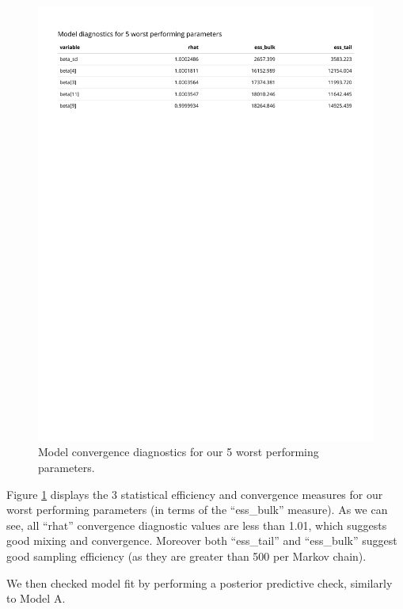 \documentclass[
]{article}
\begin{document}
\begin{figure}

{\centering \includegraphics[width=1\linewidth]{../outputs/bayesian-analysis-landfall-freq/model-no-year-effect/no-year-model-diagnostics} 

}

\caption{Model convergence diagnostics for our 5 worst performing parameters.}\label{fig:figs11}
\end{figure}

Figure \ref{fig:figs11} displays the 3 statistical efficiency and convergence measures for our worst performing parameters (in terms of the ``ess\_bulk'' measure). As we can see, all ``rhat'' convergence diagnostic values are less than 1.01, which suggests good mixing and convergence. Moreover both ``ess\_tail'' and ``ess\_bulk'' suggest good sampling efficiency (as they are greater than 500 per Markov chain).

We then checked model fit by performing a posterior predictive check, similarly to Model A.
\end{document}
